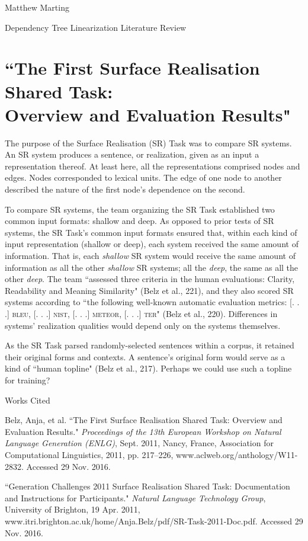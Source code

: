 \documentclass[12pt,letterpaper]{article}
\def \mylastname {Marting}
\def \myname {Matthew \mylastname{}}
\newenvironment{workscited}{
  \newcommand{\bibentry}{\noindent{}\hangindent=0.5in}
  \newpage{}
  {\centering{}Works Cited\par{}}
}{\newpage{}}
\begin{document}
\begin{flushleft}
  \myname{}\\
  {\centering{}Dependency Tree Linearization Literature Review\par{}}
  \setlength{\parindent}{0.5in}
  \section*{``The First Surface Realisation Shared Task:\\
  Overview and Evaluation Results"}
  The purpose of the Surface Realisation (SR) Task was to compare SR systems. An SR system produces a sentence, or realization, given as an input a representation thereof. At least here, all the representations comprised nodes and edges. Nodes corresponded to lexical units. The edge of one node to another described the nature of the first node's dependence on the second.

  To compare SR systems, the team organizing the SR Task established two common input formats: shallow and deep. As opposed to prior tests of SR systems, the SR Task's common input formats ensured that, within each kind of input representation (shallow or deep), each system received the same amount of information. That is, each \textit{shallow} SR system would receive the same amount of information as all the other \textit{shallow} SR systems; all the \textit{deep}, the same as all the other \textit{deep}. The team ``assessed three criteria in the human evaluations: Clarity, Readability and Meaning Similarity" (Belz et al., 221), and they also scored SR systems according to ``the following well-known automatic evaluation metrics: [. . .] \textsc{bleu}, [. . .] \textsc{nist}, [. . .] \textsc{meteor}, [. . .] \textsc{ter}" (Belz et al., 220). Differences in systems' realization qualities would depend only on the systems themselves.

  As the SR Task parsed randomly-selected sentences within a corpus, it retained their original forms and contexts. A sentence's original form would serve as a kind of ``human topline" (Belz et al., 217). Perhaps we could use such a topline for training?
  \begin{workscited}
    \bibentry{}Belz, Anja, et al. ``The First Surface Realisation Shared Task: Overview and Evaluation Results." \textit{Proceedings of the 13th European Workshop on Natural Language Generation (ENLG)}, Sept. 2011, Nancy, France, Association for Computational Linguistics, 2011, pp. 217--226, www.aclweb.org/anthology/W11-2832. Accessed 29 Nov. 2016.

    \bibentry{}``Generation Challenges 2011 Surface Realisation Shared Task: Documentation and Instructions for Participants." \textit{Natural Language Technology Group}, University of Brighton, 19 Apr. 2011, www.itri.brighton.ac.uk/home/Anja.Belz/pdf/SR-Task-2011-Doc.pdf. Accessed 29 Nov. 2016.
  \end{workscited}
\end{flushleft}
\end{document}
